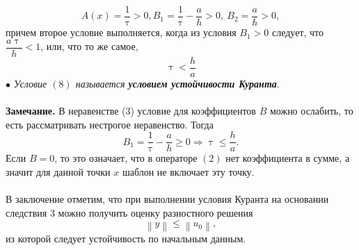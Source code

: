 \documentclass[a4paper, 12pt]{report}
\numberwithin{equation}{section}
\renewcommand{\leq}{\leqslant}
\renewcommand{\geq}{\geqslant}
\renewcommand{\tau}{\uptau}
\newcommand\Norm[1]{\left\| #1 \right\|}
\begin{document}
 $$A(x) = \dfrac 1 \tau > 0, B_1 = \dfrac 1 \tau - \dfrac a h > 0,\ B_2 = \dfrac a h > 0,$$
 причем второе условие выполняется, когда из условия $B_1 > 0$ следует, что $\dfrac {a\tau } h < 1$, или, что то же самое, \begin{equation}
	 	\tau < \dfrac h a
 \end{equation}
 $\bullet$ \textit{Условие $(8)$ называется \textbf{условием устойчивости Куранта}}.\\\\
 \textbf{Замечание.} В неравенстве (3) условие для коэффициентов $B$ можно ослабить, то есть рассматривать нестрогое неравенство. Тогда
 $$B_1 = \dfrac 1 \tau - \dfrac a h \geq 0 \Rightarrow \tau \leq \dfrac h a.$$
 Если $B=0$, то это означает, что в операторе $(2)$ нет коэффициента в сумме, а значит для данной точки $x$ шаблон не включает эту точку.\\\\
 В заключение отметим, что при выполнении условия Куранта на основании следствия 3 можно получить оценку разностного решения
 $$\Norm{y}\leq \Norm{u_0},$$
 из которой следует устойчивость по начальным данным.
\end{document}
